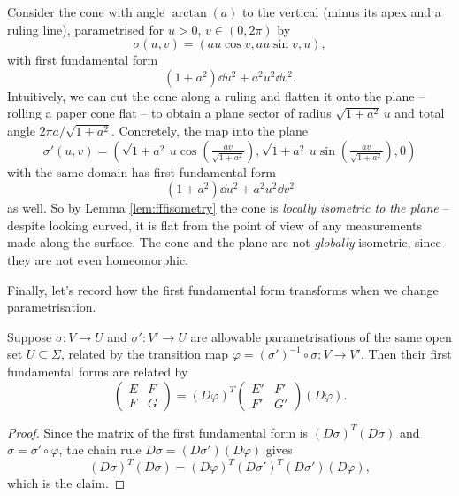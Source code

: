 \begin{example}\label{ex:cone}
    Consider the cone with angle $\arctan(a)$ to the vertical (minus its apex and a ruling line), parametrised for $u > 0$, $v \in (0, 2\pi)$ by
    $$
    \sigma(u, v) = (a u \cos v, au\sin v, u),
    $$
    with first fundamental form
    $$
    (1 + a^2) \dd u^2 + a^2 u^2 \dd v^2.
    $$
    Intuitively, we can cut the cone along a ruling and flatten it onto the plane -- rolling a paper cone flat -- to obtain a plane sector of radius $\sqrt{1 + a^2}\,u$ and total angle $2\pi a / \sqrt{1 + a^2}$. Concretely, the map into the plane
    $$
    \sigma'(u, v) = \left(\sqrt{1 + a^2}\, u \cos\left(\tfrac{a v}{\sqrt{1 + a^2}}\right), \sqrt{1 + a^2} \, u \sin\left(\tfrac{av}{\sqrt{1+a^2}}\right), 0\right)
    $$
    with the same domain has first fundamental form
    $$
    (1 + a^2) \dd u^2 + a^2 u^2 \dd v^2
    $$
    as well. So by Lemma \ref{lem:fffisometry} the cone is \emph{locally isometric to the plane} -- despite looking curved, it is flat from the point of view of any measurements made along the surface. The cone and the plane are not \emph{globally} isometric, since they are not even homeomorphic.
\end{example}

Finally, let's record how the first fundamental form transforms when we change parametrisation.

\begin{lemma}
    Suppose $\sigma: V \rightarrow U$ and $\sigma': V' \rightarrow U$ are allowable parametrisations of the same open set $U \subseteq \Sigma$, related by the transition map $\varphi = (\sigma')^{-1} \circ \sigma : V \rightarrow V'$. Then their first fundamental forms are related by
    $$
    \begin{pmatrix} E & F \\ F & G\end{pmatrix} = (D\varphi)^T \begin{pmatrix} E' & F' \\ F' & G' \end{pmatrix} (D\varphi).
    $$
\end{lemma}
\begin{proof}
    Since the matrix of the first fundamental form is $(D\sigma)^T(D\sigma)$ and $\sigma = \sigma' \circ \varphi$, the chain rule $D\sigma = (D\sigma')( D\varphi)$ gives
    $$
    (D\sigma)^T (D\sigma) = (D\varphi)^T (D\sigma')^T (D\sigma') (D\varphi),
    $$
    which is the claim.
\end{proof}

